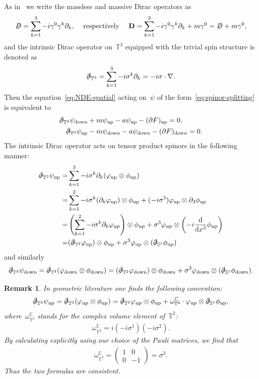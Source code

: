 \documentclass[10pt,a4paper]{amsart}
\newcommand{\p}{\partial}
\newcommand{\C}{\mathbb{C}}
\newcommand{\T}{\mathbb{T}}
\newcommand{\D}{\slashed{D}}
\newcommand{\pd}{\slashed{\partial}}
\newcommand{\dd}{\mathop{}\!\mathrm{d}}
\newcommand{\sph}{\mathbb{S}}
\newcommand{\pD}{\mathbf{D}}
\newcommand{\parenthesis}[1]{\left(#1\right)} %
\DeclareMathOperator{\up}{up}
\DeclareMathOperator{\down}{down}
\newtheorem{rmk}[thm]{Remark}
\begin{document}
As in~\cite{WZ2026Stationary} we write the massless and massive Dirac operators as 
\begin{align}
    \D=\sum_{k=1}^3 -i\gamma^0\gamma^k \p_k, & & \mbox{ respectively } & & 
    \pD=\sum_{k=1}^3 -i\gamma^0\gamma^k\p_k+m\gamma^0 =\D+m\gamma^0, 
\end{align}
and the intrinsic Dirac operator on~$\mathbb{T}^3$ equipped with the trivial spin structure is denoted as 
\begin{align}
    \pd_{\T^3}=\sum_{k=1}^3 -i\sigma^k \p_k = -i\sigma\cdot \nabla. 
\end{align}
Then the equation~\eqref{eq:NDE-spatial} acting on~$\psi$ of the form~\eqref{eq:spinor-splitting} is equivalent to 
\begin{align}
    \pd_{\T^3}\psi_{\down} & + m\psi_{\up} - a \psi_{\up} - (\p F)_{\up}=0,  \\
    \pd_{\T^3}\psi_{\up} & -m\psi_{\down} - a \psi_{\down} - (\p F)_{\down }=0. 
\end{align}
The intrinsic Dirac operator acts on tensor product spinors in the following manner: 
\begin{align}
    \pd_{\T^3} \psi_{\up} 
    =& \sum_{k=1}^3  -i\sigma^k\p_k (\varphi_{\up}\otimes \phi_{\up}) \\
    =& \sum_{k=1}^2 -i\sigma^k(\p_k\varphi_{\up})\otimes \phi_{\up}  + (-i\sigma^3)\varphi_{\up}\otimes \p_3\phi_{\up} \\
    =& \parenthesis{\sum_{k=1}^2 -i\sigma^k\p_k\varphi_{\up} }\otimes \phi_{\up}
       + \sigma^3\varphi_{\up}\otimes \parenthesis{-i\frac{\dd}{\dd x^3}\phi_{\up}} \\
    =& (\pd_{\T^2}\varphi_{\up})\otimes\phi_{\up}
        +\sigma^3\varphi_{\up}\otimes (\pd_{\sph^1}\phi_{\up})
\end{align}
and similarly 
\begin{align}
    \pd_{\T^3}\psi_{\down}
    = \pd_{\T^3} (\varphi_{\down}\otimes \phi_{\down}) 
    = (\pd_{\T^2} \varphi_{\down})\otimes \phi_{\down}
     + \sigma^3\varphi_{\down}\otimes (\pd_{\sph^1}\phi_{\down}). 
\end{align}
\begin{rmk}
    In geometric literature one finds the following convention:
    \begin{align}
        \pd_{\T^3} \psi_{\up} 
    = \pd_{\T^3} (\varphi_{\up}\otimes \phi_{\up}) 
    = \pd_{\T^2} \varphi_{\up}\otimes \phi_{\up}
     + \omega_{\T^2}^{\C}\cdot\varphi_{\up}\otimes \pd_{\sph^1}\phi_{\up},
    \end{align}
    where~$\omega_{\T^2}^{\C}$ stands for the complex volume element of~$\T^2$:
    \begin{align}
    \omega_{\T^2}^{\C}=i(-i\sigma^1)(-i\sigma^2).
    \end{align}
    By calculating explicitly using our choice of the Pauli matrices, we find that 
    \begin{align}
        \omega_{\T^2}^{\C}= \begin{pmatrix} 1 & 0 \\ 0 & -1 \end{pmatrix} = \sigma^3.
    \end{align}
    Thus the two formulas are consistent. 
\end{rmk}
\end{document}
